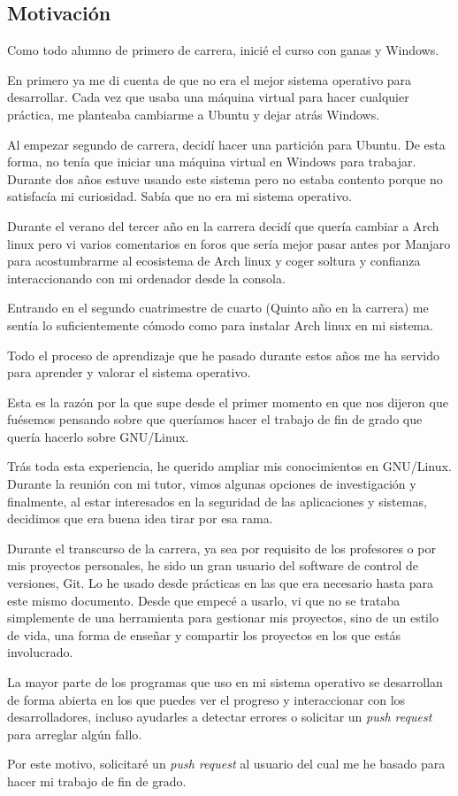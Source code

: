 \documentclass[titlepage, 12pt, a4paper]{article}
\begin{document}
\subsection{Motivación}
Como todo alumno de primero de carrera, inicié el curso con ganas y Windows.\par En primero ya me di cuenta de que no era el mejor sistema operativo para desarrollar. Cada vez que usaba una máquina virtual para hacer cualquier práctica, me planteaba cambiarme a \Gls{Ubuntu} y dejar atrás Windows.\par Al empezar segundo de carrera, decidí hacer una partición para \Gls{Ubuntu}. De esta forma, no tenía que iniciar una máquina virtual en Windows para trabajar. Durante dos años estuve usando este sistema pero no estaba contento porque no satisfacía mi curiosidad. Sabía que no era mi sistema operativo.\par Durante el verano del tercer año en la carrera decidí que quería cambiar a \Gls{Arch linux} pero vi varios comentarios en foros que sería mejor pasar antes por \Gls{Manjaro} para acostumbrarme al ecosistema de \Gls{Arch linux} y coger soltura y confianza interaccionando con mi ordenador desde la consola.\par Entrando en el segundo cuatrimestre de cuarto (Quinto año en la carrera) me sentía lo suficientemente cómodo como para instalar \Gls{Arch linux} en mi sistema.\par Todo el proceso de aprendizaje que he pasado durante estos años me ha servido para aprender y valorar el sistema operativo.\par Esta es la razón por la que supe desde el primer momento en que nos dijeron que fuésemos pensando sobre que queríamos hacer el trabajo de fin de grado que quería hacerlo sobre \Gls{GNU/Linux}.\par Trás toda esta experiencia, he querido ampliar mis conocimientos en \Gls{GNU/Linux}. Durante la reunión con mi tutor, vimos algunas opciones de investigación y finalmente, al estar interesados en la seguridad de las aplicaciones y sistemas, decidimos que era buena idea tirar por esa rama.\par Durante el transcurso de la carrera, ya sea por requisito de los profesores o por mis proyectos personales, he sido un gran usuario del software de control de versiones, \Gls{Git}. Lo he usado desde prácticas en las que era necesario hasta para este mismo documento. Desde que empecé a usarlo, vi que no se trataba simplemente de una herramienta para gestionar mis proyectos, sino de un estilo de vida, una forma de enseñar y compartir los proyectos en los que estás involucrado.\par La mayor parte de los programas que uso en mi sistema operativo se desarrollan de forma abierta en los que puedes ver el progreso y interaccionar con los desarrolladores, incluso ayudarles a detectar errores o solicitar un \textit{push request} para arreglar algún fallo.\par Por este motivo, solicitaré un \textit{push request} al usuario del cual me he basado para hacer mi trabajo de fin de grado.
\end{document}
